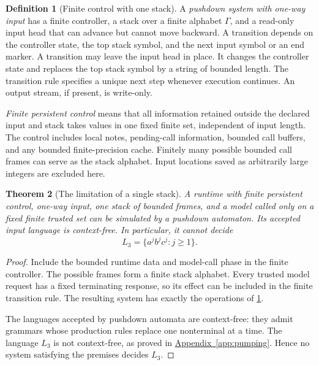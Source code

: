 \documentclass[11pt,twoside]{article}
\newcommand{\appendixref}[1]{\hyperref[#1]{Appendix~\ref*{#1}}}
\newtheorem{theorem}{Theorem}[section]
\theoremstyle{definition}
\newtheorem{definition}[theorem]{Definition}
\theoremstyle{remark}
\begin{document}
\begin{definition}[Finite control with one stack]
\label{def:pushdown}
A \emph{pushdown system with one-way input} has a finite controller, a stack
over a finite alphabet $\Gamma$, and a read-only input head that can advance
but cannot move backward. A transition depends on the controller state,
the top stack symbol, and the next input symbol or an end marker. A
transition may leave the input head in place. It changes the controller
state and replaces the top stack symbol by a string of bounded length.
The transition rule specifies a unique next step whenever execution
continues. An output stream, if present, is write-only.
\end{definition}

\emph{Finite persistent control} means that all information retained outside
the declared input and stack takes values in one fixed finite set,
independent of input length. The control includes local notes, pending-call
information, bounded call buffers, and any bounded finite-precision cache.
Finitely many possible bounded call frames can serve as the stack alphabet.
Input locations saved as arbitrarily large integers are excluded here.

\begin{theorem}[The limitation of a single stack]
\label{thm:stack}
A runtime with finite persistent control, one-way input, one stack of
bounded frames, and a model called only on a fixed finite trusted set can
be simulated by a pushdown automaton. Its accepted input language is
context-free. In particular, it cannot decide
\begin{equation}
 L_3=\{a^j b^j c^j:j\geq1\}.
 \label{eq:three-blocks}
\end{equation}
\end{theorem}
\begin{proof}
Include the bounded runtime data and model-call phase in the finite
controller. The possible frames form a finite stack alphabet. Every
trusted model request has a fixed terminating response, so its effect can
be included in the finite transition rule. The resulting system has exactly
the operations of \cref{def:pushdown}.

The languages accepted by pushdown automata are context-free: they admit
grammars whose production rules replace one nonterminal at a time. The
language $L_3$ is not context-free, as proved in
\appendixref{app:pumping}. Hence no system satisfying the premises decides
$L_3$.
\end{proof}
\end{document}
